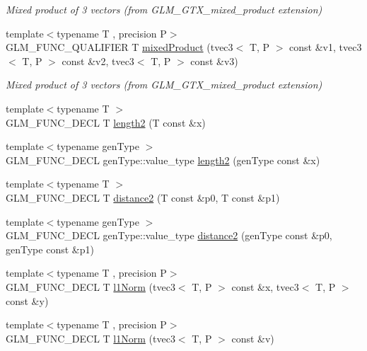 \begin{DoxyCompactItemize}
\begin{DoxyCompactList}\small\item\em Mixed product of 3 vectors (from G\+L\+M\+\_\+\+G\+T\+X\+\_\+mixed\+\_\+product extension) \end{DoxyCompactList}\item 
{\footnotesize template$<$typename T , precision P$>$ }\\G\+L\+M\+\_\+\+F\+U\+N\+C\+\_\+\+Q\+U\+A\+L\+I\+F\+I\+E\+R T \hyperlink{group__gtx__mixed__product_gaaee4cf80d69cb86de80f12af88b3c3af}{mixed\+Product} (tvec3$<$ T, P $>$ const \&v1, tvec3$<$ T, P $>$ const \&v2, tvec3$<$ T, P $>$ const \&v3)
\begin{DoxyCompactList}\small\item\em Mixed product of 3 vectors (from G\+L\+M\+\_\+\+G\+T\+X\+\_\+mixed\+\_\+product extension) \end{DoxyCompactList}\item 
{\footnotesize template$<$typename T $>$ }\\G\+L\+M\+\_\+\+F\+U\+N\+C\+\_\+\+D\+E\+C\+L T \hyperlink{group__gtx__norm_ga08c670024cd230e22f8b853f185ff533}{length2} (T const \&x)
\item 
{\footnotesize template$<$typename gen\+Type $>$ }\\G\+L\+M\+\_\+\+F\+U\+N\+C\+\_\+\+D\+E\+C\+L gen\+Type\+::value\+\_\+type \hyperlink{group__gtx__norm_gaa279ba7fdecbed3f9f2b60502b7ec8ca}{length2} (gen\+Type const \&x)
\item 
{\footnotesize template$<$typename T $>$ }\\G\+L\+M\+\_\+\+F\+U\+N\+C\+\_\+\+D\+E\+C\+L T \hyperlink{group__gtx__norm_ga3544f6288d3bce2cf2a9f6ebe39e0557}{distance2} (T const \&p0, T const \&p1)
\item 
{\footnotesize template$<$typename gen\+Type $>$ }\\G\+L\+M\+\_\+\+F\+U\+N\+C\+\_\+\+D\+E\+C\+L gen\+Type\+::value\+\_\+type \hyperlink{group__gtx__norm_gaec2d9df62436879b48207d39516f3788}{distance2} (gen\+Type const \&p0, gen\+Type const \&p1)
\item 
{\footnotesize template$<$typename T , precision P$>$ }\\G\+L\+M\+\_\+\+F\+U\+N\+C\+\_\+\+D\+E\+C\+L T \hyperlink{group__gtx__norm_gaebe5a39b06e262e615622129f37da4f4}{l1\+Norm} (tvec3$<$ T, P $>$ const \&x, tvec3$<$ T, P $>$ const \&y)
\item 
{\footnotesize template$<$typename T , precision P$>$ }\\G\+L\+M\+\_\+\+F\+U\+N\+C\+\_\+\+D\+E\+C\+L T \hyperlink{group__gtx__norm_ga6d5964f09cdb43803496a5ee3ced71cb}{l1\+Norm} (tvec3$<$ T, P $>$ const \&v)

\end{DoxyCompactItemize}
